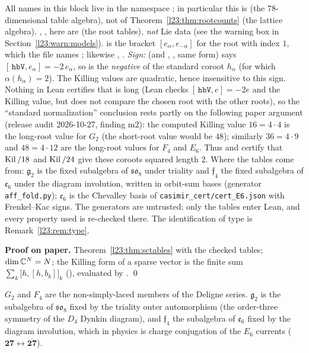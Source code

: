 \begin{dictionary}
All names in this block live in the namespace ; in particular this  is
 (the $78$-dimensional table algebra), not  of Theorem~\ref{l23:thm:rootcounts}
(the lattice algebra). , ,  here are  (the root tables), \emph{not} Lie data (see the
warning box in Section~\ref{l23:warn:models}).  is the bracket $[e_\alpha,e_{-\alpha}]$ for the root with index $1$, which
the file names ; likewise , . \emph{Sign:}  (and , ,
same form) says $[\,\mathtt{hbV},e_\alpha]=-2\,e_\alpha$, so  is the \emph{negative} of the standard coroot $h_\alpha$ (for which
$\alpha(h_\alpha)=2$). The Killing values are quadratic, hence insensitive to this sign. Nothing in Lean certifies that  is long
(Lean checks $[\,\mathtt{hbV},e]=-2e$ and the Killing value, but does not compare the chosen root with the other roots), so the
``standard normalization'' conclusion rests partly on the following paper argument (release audit 2026-10-27, finding m2): the computed Killing value $16=4\cdot4$ is the long-root value for $G_2$ (the short-root value would be $48$); similarly $36=4\cdot9$
and $48=4\cdot12$ are the long-root values for $F_4$ and $E_6$. Thus  and  certify that
$\operatorname{Kil}/18$ and $\operatorname{Kil}/24$ give these coroots squared length $2$. Where the
tables come from: $\mathfrak g_2$ is the fixed subalgebra of $\mathfrak{so}_8$ under triality and $\mathfrak f_4$ the fixed subalgebra of $\mathfrak e_6$
under the diagram involution, written in orbit-sum bases (generator \texttt{aff\_fold.py}); $\mathfrak e_6$ is the Chevalley basis of
\texttt{casimir\_cert/cert\_E6.json} with Frenkel--Kac signs. The generators are untrusted; only the tables enter Lean, and every property used
is re-checked there. The identification of type is Remark~\ref{l23:rem:type}.
\end{dictionary}

\textbf{Proof on paper.} Theorem~\ref{l23:thm:sctables} with the checked tables; $\dim{\mathbb{C}}^N=N$; the Killing form of a sparse vector is the
finite sum $\sum_k\big[h,[h,b_k]\big]_k$ (), evaluated by . \qed

\begin{physics}
$G_2$ and $F_4$ are the non-simply-laced members of the Deligne series. $\mathfrak g_2$ is the subalgebra of $\mathfrak{so}_8$ fixed by
the triality outer automorphism (the order-three symmetry of the $D_4$ Dynkin diagram), and $\mathfrak f_4$ the subalgebra of $\mathfrak e_6$
fixed by the diagram involution, which in physics is charge conjugation of the $E_6$ currents ($\mathbf{27}\leftrightarrow\overline{\mathbf{27}}$).
\end{physics}

